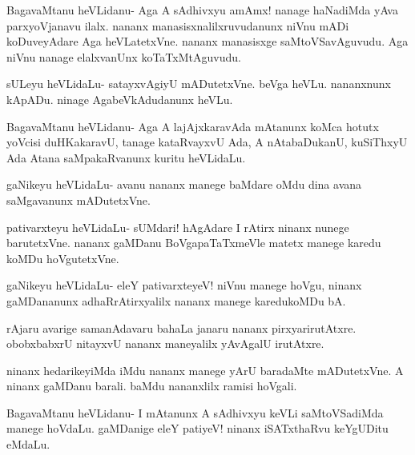 \documentclass{article}
\begin{document}
\begin{mng}%
BagavaMtanu heVLidanu- Aga A sAdhivxyu amAmx! nanage haNadiMda
yAva parxyoVjanavu ilalx. nananx manasisxnalilxruvudanunx niVnu mADi
koDuveyAdare Aga heVLatetxVne. nananx manasisxge saMtoVSavAguvudu.
Aga niVnu nanage elalxvanUnx koTaTxMtAguvudu.
\end{mng}

\begin{mng}%
sULeyu heVLidaLu- satayxvAgiyU mADutetxVne. beVga heVLu.
nananxnunx kApADu. ninage AgabeVkAdudanunx heVLu.
\end{mng}

\begin{mng}%
BagavaMtanu heVLidanu- Aga A lajAjxkaravAda mAtanunx koMca
hotutx yoVcisi duHKakaravU, tanage kataRvayxvU Ada, A nAtabaDukanU,
kuSiThxyU Ada Atana saMpakaRvanunx kuritu heVLidaLu.
\end{mng}

\begin{mng}%
gaNikeyu heVLidaLu- avanu nananx manege baMdare oMdu dina
avana saMgavanunx mADutetxVne.
\end{mng}

\begin{mng}%
pativarxteyu heVLidaLu- sUMdari! hAgAdare I rAtirx ninanx 
nunege barutetxVne. nananx gaMDanu BoVgapaTaTxmeVle matetx manege karedu
koMDu hoVgutetxVne.
\end{mng}

\begin{mng}%
gaNikeyu heVLidaLu- eleY pativarxteyeV! niVnu manege
hoVgu, ninanx gaMDananunx adhaRrAtirxyalilx nananx manege karedukoMDu bA.
\end{mng}

\begin{mng}%
rAjaru avarige samanAdavaru bahaLa janaru nananx pirxyarirutAtxre.
obobxbabxrU nitayxvU nananx maneyalilx yAvAgalU irutAtxre.
\end{mng}

\begin{mng}%
ninanx hedarikeyiMda iMdu nananx manege yArU baradaMte
mADutetxVne. A ninanx gaMDanu barali. baMdu nananxlilx ramisi hoVgali.
\end{mng}

\begin{mng}%
BagavaMtanu heVLidanu- I mAtanunx A sAdhivxyu keVLi
saMtoVSadiMda manege hoVdaLu. gaMDanige eleY patiyeV! ninanx iSATxthaRvu
keYgUDitu eMdaLu.
\end{mng}
\end{document}
